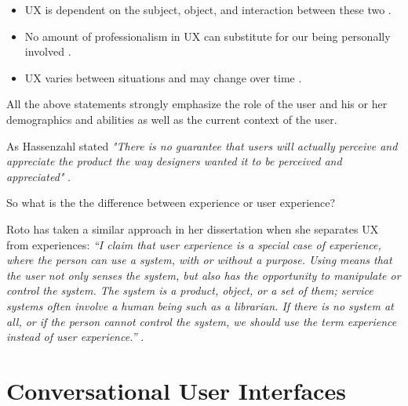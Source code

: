 % 
% 
% 
% 
% 
% 
% 
% 

\begin{itemize}
\item UX is dependent on the subject, object, and interaction between these two \cite{luojus2010}.
\item No amount of professionalism in UX can substitute for our being personally involved \cite{alben1997}.
\item UX varies between situations and may change over time \cite{hassenzahl2003}.
\end{itemize}

All the above statements strongly emphasize the role of the user and his or her demographics and abilities as well as the current context of the user.

As Hassenzahl stated \textit{"There is no guarantee that users will actually perceive and appreciate the product the way designers wanted it to be perceived and appreciated"} \cite{hassenzahl2003}.

So what is the the difference between experience or user experience? 

Roto has taken a similar approach in her dissertation when she separates UX from experiences: \textit{“I claim that user experience is a special case of experience, where the person can use a system, with or without a purpose. Using means that the user not only senses the system, but also has the opportunity to manipulate or control the system. The system is a product, object, or a set of them; service systems often involve a human being such as a librarian. If there is no system at all, or if the person cannot control the system, we should use the term experience instead of user experience.”} \cite{roto2006}.



\section{Conversational User Interfaces}

